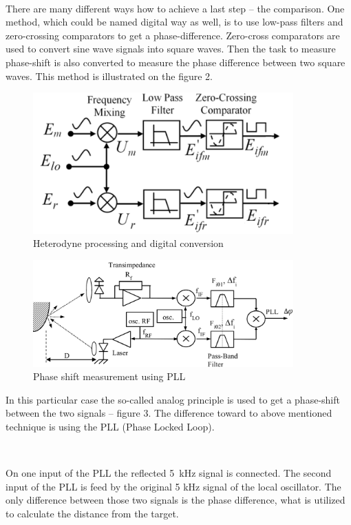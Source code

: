 \documentclass[fleqn]{article}
\begin{document}
~

There are many different ways how to achieve a last step – the comparison. One method, which could be named digital way as well, is to use low-pass filters and zero-crossing comparators to get a phase-difference. Zero-cross comparators are used to convert sine wave signals into square waves. Then the task to measure phase-shift is also converted to measure the phase difference between two square waves. This method is illustrated on the figure 2.

\begin{figure}[h]
    \begin{center}
        \includegraphics[width=10cm]{fin.png}
    \end{center}
    \caption{Heterodyne processing and digital conversion}
\end{figure}

\begin{figure}[h]
    \begin{center}
        \includegraphics[width=10cm]{todo.png}
    \end{center}
    \caption{Phase shift measurement using PLL}
\end{figure}

In this particular case the so-called analog principle is used to get a phase-shift between the two signals – figure 3. The difference toward to above mentioned technique is using the PLL (Phase Locked Loop).

~

On one input of the PLL the reflected 5 kHz signal is connected. The second input of the PLL is feed by the original 5 kHz signal of the local oscillator. The only difference between those two signals is the phase difference, what is utilized to calculate the distance from the target.
\end{document}
